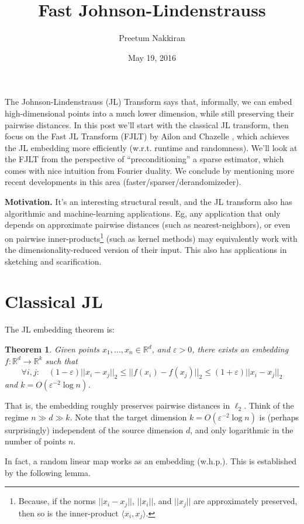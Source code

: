 \documentclass[]{article}
\title{Fast Johnson-Lindenstrauss}
\author{Preetum Nakkiran}
\date{May 19, 2016}
\newtheorem{theorem}{Theorem}
\newcommand{\1}{\mathbb{1}}
\newcommand{\R}{\mathbb{R}}
\renewcommand{\epsilon}{\varepsilon}
\newcommand{\innp}[1]{\langle #1 \rangle}
\begin{document}
\maketitle

The Johnson-Lindenstrauss (JL) Transform says that, informally,
we can embed high-dimensional points into a much lower dimension, while still
preserving their pairwise distances.
In this post we'll start with the classical JL transform,
then focus on the Fast JL Transform (FJLT) by Ailon and Chazelle \cite{fjlt},
which achieves the JL embedding more
efficiently (w.r.t. runtime and randomness).
We'll look at the FJLT from the perspective of ``preconditioning'' a sparse
estimator, which comes with nice intuition from Fourier duality.
We conclude by mentioning more recent developments in this area
(faster/sparser/derandomizeder).

{\bf Motivation.}
It's an interesting structural result, and the JL transform also has
algorithmic and machine-learning applications. Eg, any application that only
depends on approximate pairwise distances (such as nearest-neighbors), or even on pairwise
inner-products\footnote{Because, if the norms $||x_i-x_j||$, $||x_i||$, and $||x_j||$ are
    approximately preserved, then so is the inner-product $\innp{x_i,x_j}$.
}
(such as kernel methods) may equivalently work with the
dimensionality-reduced version of their input.
This also has applications in sketching and scarification.

\section{Classical JL}
The JL embedding theorem is:

\begin{theorem}
Given points $x_1, \dots, x_n \in \R^d$, and $\epsilon > 0$, there exists an embedding $f: \R^d \to
\R^k$ such that
$$\forall i, j: \quad
(1-\epsilon) ||x_i - x_j||_2
\leq
||f(x_i) - f(x_j)||_2
\leq
(1+\epsilon) ||x_i - x_j||_2
$$
and $k = O(\epsilon^{-2}\log n)$.
\end{theorem}
That is, the embedding roughly preserves pairwise distances in $\ell_2$.
Think of the regime $n \gg d \gg k$.
Note that the target dimension $k = O(\epsilon^{-2}\log n)$
is (perhaps surprisingly) independent of the source dimension $d$, and only
logarithmic in the number of points $n$.


In fact, a random linear map works as an embedding (w.h.p.).
This is established by the following lemma.
\end{document}
